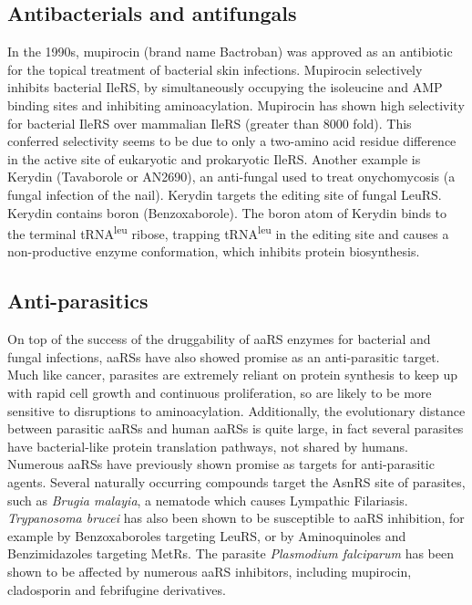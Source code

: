 \subsection{Antibacterials and antifungals}
In the 1990s, mupirocin (brand name Bactroban) was approved as an antibiotic for the topical treatment of bacterial skin infections.
Mupirocin selectively inhibits bacterial IleRS, by simultaneously occupying the isoleucine and AMP binding sites and inhibiting aminoacylation\cite{hurdle2005prospects}.
Mupirocin has shown high selectivity for bacterial IleRS over mammalian IleRS (greater than 8000 fold)\cite{hughes1980interaction}.
This conferred selectivity seems to be due to only a two-amino acid residue difference in the active site of eukaryotic and prokaryotic IleRS\cite{nakama2001structural}.
Another example is Kerydin (Tavaborole or AN2690), an anti-fungal used to treat onychomycosis (a fungal infection of the nail)\cite{fernandes2019boron}.
Kerydin targets the editing site of fungal LeuRS\@.
Kerydin contains boron (Benzoxaborole)\cite{fernandes2019boron}.
The boron atom of Kerydin binds to the terminal tRNA\textsuperscript{leu} ribose, trapping tRNA\textsuperscript{leu} in the editing site and causes a non-productive enzyme conformation, which inhibits protein biosynthesis.

\subsection{Anti-parasitics}
On top of the success of the druggability of aaRS enzymes for bacterial and fungal infections, aaRSs have also showed promise as an anti-parasitic target.
Much like cancer, parasites are extremely reliant on protein synthesis to keep up with rapid cell growth and continuous proliferation, so are likely to be more sensitive to disruptions to aminoacylation.
Additionally, the evolutionary distance between parasitic aaRSs and human aaRSs is quite large, in fact several parasites have bacterial-like protein translation pathways, not shared by humans\cite{pham2014aminoacyl}.
Numerous aaRSs have previously shown promise as targets for anti-parasitic agents.
Several naturally occurring compounds target the AsnRS site of parasites, such as \textit{Brugia malayia}, a nematode which causes Lympathic Filariasis.
\textit{Trypanosoma brucei} has also been shown to be susceptible to aaRS inhibition, for example by Benzoxaboroles targeting LeuRS, or by Aminoquinoles and
Benzimidazoles targeting MetRs.
The parasite \textit{Plasmodium falciparum} has been shown to be affected by numerous aaRS inhibitors, including mupirocin, cladosporin and febrifugine derivatives.

